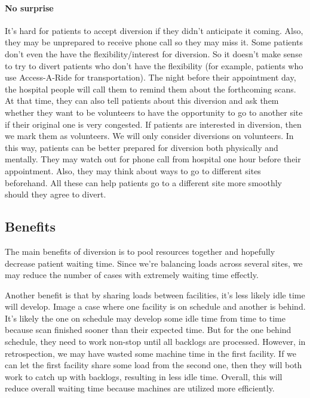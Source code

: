 \paragraph{No surprise} It's hard for patients to accept diversion if they didn't anticipate it coming. Also, they may be unprepared to receive phone call so they may miss it. Some patients don't even the have the flexibility/interest for diversion. So it doesn't make sense to try to divert patients who don't have the flexibility (for example, patients who use Access-A-Ride for transportation). The night before their appointment day, the hospital people will call them to remind them about the forthcoming scans. At that time, they can also tell patients about this diversion and ask them whether they want to be volunteers to have the opportunity to go to another site if their original one is very congested. If patients are interested in diversion, then we mark them as volunteers. We will only consider diversions on volunteers. In this way, patients can be better prepared for diversion both physically and mentally. They may watch out for phone call from hospital one hour before their appointment. Also, they may think about ways to go to different sites beforehand. All these can help patients go to a different site more smoothly should they agree to divert. 

\subsection{Benefits}

The main benefits of diversion is to pool resources together and hopefully decrease patient waiting time. Since we're balancing loads across several sites, we may reduce the number of cases with extremely waiting time effectly.

Another benefit is that by sharing loads between facilities, it's less likely idle time will develop. Image a case where one facility is on schedule and another is behind. It's likely the one on schedule may develop some idle time from time to time because scan finished sooner than their expected time. But for the one behind schedule, they need to work non-stop until all backlogs are processed. However, in retrospection, we may have wasted some machine time in the first facility. If we can let the first facility share some load from the second one, then they will both work to catch up with backlogs, resulting in less idle time. Overall, this will reduce overall waiting time because machines are utilized more efficiently.
